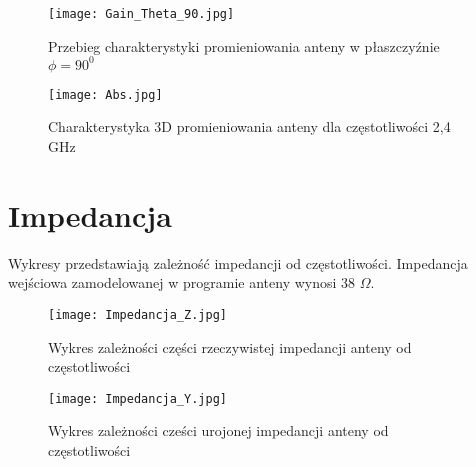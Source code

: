 \noindent
\newline

\begin{figure}[h!]
\centering
	\texttt{[image: Gain\_Theta\_90.jpg]}
	\caption{Przebieg charakterystyki promieniowania anteny w płaszczyźnie $\phi = 90^{0}$}
\end{figure}

\noindent
\newline

\begin{figure}[h!]
\centering
	\texttt{[image: Abs.jpg]}
	\caption{Charakterystyka 3D promieniowania anteny dla częstotliwości 2,4 GHz}
\end{figure}



\noindent
\newline
\newpage

\section{Impedancja}
Wykresy przedstawiają zależność impedancji od częstotliwości. 
\newline Impedancja wejściowa zamodelowanej w programie anteny wynosi 38 \(\Omega\).

\begin{figure}[h!]
\centering
	\texttt{[image: Impedancja\_Z.jpg]}
	\caption{Wykres zależności części rzeczywistej impedancji anteny od częstotliwości}
\end{figure}


\begin{figure}[h!]
\centering
	\texttt{[image: Impedancja\_Y.jpg]}
	\caption{Wykres zależności cześci urojonej impedancji anteny od częstotliwości}
\end{figure}









